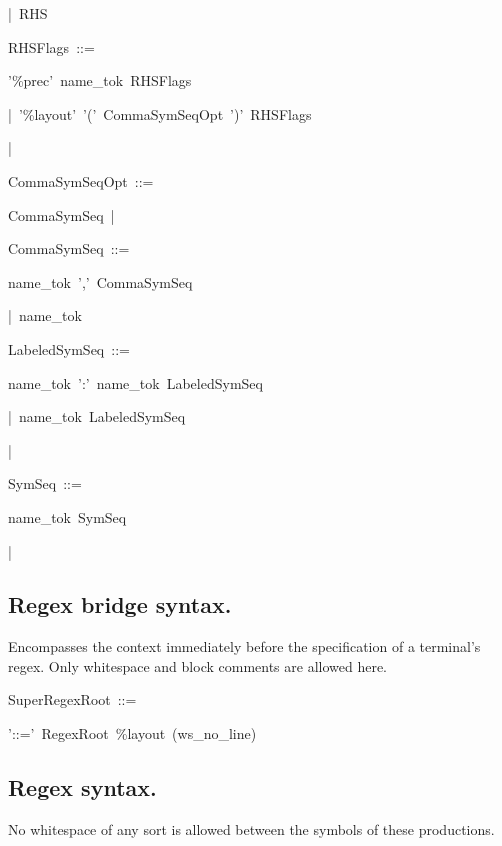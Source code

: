 \documentclass[12pt,english,twoside]{report}
\newenvironment{codeblock}
{\begin{list}{}{
\setlength{\rightmargin}{\leftmargin}
\setlength{\listparindent}{0pt}%
\raggedright
\setlength{\itemsep}{0pt}
\setlength{\parsep}{0pt}
\normalfont\ttfamily}%
 \item[]}
{\end{list}}
\begin{document}
\begin{codeblock}
\begin{codeblock}
|~RHS
\end{codeblock}
RHSFlags~::=
\begin{codeblock}
'\%prec'~name\_tok~RHSFlags

|~'\%layout'~'('~CommaSymSeqOpt~')'~RHSFlags

|~
\end{codeblock}
CommaSymSeqOpt~::=
\begin{codeblock}
CommaSymSeq~|~
\end{codeblock}
CommaSymSeq~::=
\begin{codeblock}
name\_tok~','~CommaSymSeq

|~name\_tok
\end{codeblock}
LabeledSymSeq~::=
\begin{codeblock}
name\_tok~':'~name\_tok~LabeledSymSeq

|~name\_tok~LabeledSymSeq

|~
\end{codeblock}
SymSeq~::=
\begin{codeblock}
name\_tok~SymSeq

|~
\end{codeblock}
\end{codeblock}

\subsection{Regex bridge syntax.}

Encompasses the context immediately before the specification of a
terminal's regex. Only whitespace and block comments are allowed here.

\begin{codeblock}
SuperRegexRoot~::=
\begin{codeblock}
'::='~RegexRoot~\%layout~(ws\_no\_line)
\end{codeblock}
\end{codeblock}

\subsection{Regex syntax.}

No whitespace of any sort is allowed between the symbols of these
productions.
\end{document}
